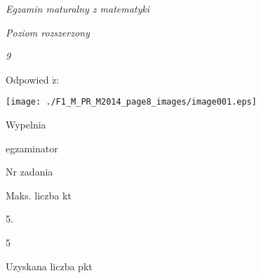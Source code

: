 \documentclass[a4paper,12pt]{article}
\begin{document}
{\it Egzamin maturalny z matematyki}

{\it Poziom rozszerzony}

{\it 9}

Odpowied $\acute{\mathrm{z}}$:
\begin{center}
\texttt{[image: ./F1\_M\_PR\_M2014\_page8\_images/image001.eps]}
\end{center}
Wypelnia

egzaminator

Nr zadania

Maks. liczba kt

5.

5

Uzyskana liczba pkt
\end{document}
